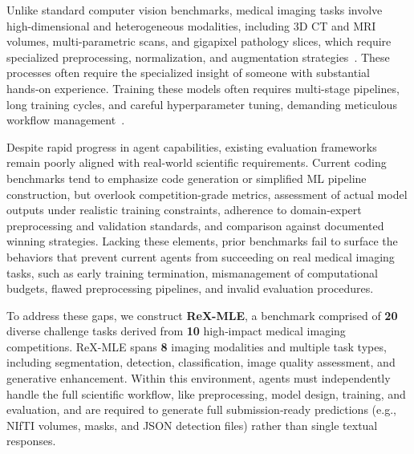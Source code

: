 \documentclass{midl} %
\begin{document}
Unlike standard computer vision benchmarks, medical imaging tasks involve high-dimensional and heterogeneous modalities, including 3D CT and MRI volumes, multi-parametric scans, and gigapixel pathology slices, which require specialized preprocessing, normalization, and augmentation strategies~\cite{shen2017deep}. These processes often require the specialized insight of someone with substantial hands‑on experience. Training these models often requires multi-stage pipelines, long training cycles, and careful hyperparameter tuning, demanding meticulous workflow management~\cite{eisenmann2023winner}. 

Despite rapid progress in agent capabilities, existing evaluation frameworks remain poorly aligned with real-world scientific requirements. Current coding benchmarks \cite{jimenez2023swe, chan2024mle, tang2023ml, padigela2025ml} tend to emphasize code generation or simplified ML pipeline construction, but overlook 
competition-grade metrics, assessment of actual model outputs under realistic training constraints, adherence to domain-expert preprocessing and validation standards, and comparison against documented winning strategies. 
Lacking these elements, prior benchmarks fail to surface the behaviors that prevent current agents from succeeding on real medical imaging tasks, such as early training termination, mismanagement of computational budgets, flawed preprocessing pipelines, and invalid evaluation procedures. 

To address these gaps, we construct \textbf{ReX-MLE}, a benchmark comprised of \textbf{20} diverse challenge tasks derived from \textbf{10} high‑impact medical imaging competitions. ReX-MLE spans \textbf{8} imaging modalities and multiple task types, including segmentation, detection, classification, image quality assessment, and generative enhancement.
Within this environment, agents must independently handle the full scientific workflow, like preprocessing, model design, training, and evaluation, and are required to generate full submission‑ready predictions (e.g., NIfTI volumes, masks, and JSON detection files) rather than single textual responses.
\end{document}

